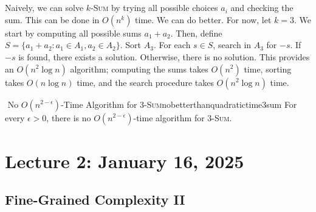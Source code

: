         \vphantom
        \\
        \\
        Naively, we can solve \(k\)-\textsc{Sum} by trying all possible choices \(a_i\) and checking the sum. This can be done in \(O(n^k)\) time. We can do better. For now, let \(k=3\). We start by computing all possible sums \(a_1+a_2\). Then, define \(S=\{a_1+a_2:a_1\in A_1,a_2\in A_2\}\). Sort \(A_3\). For each \(s\in S\), search in \(A_3\) for \(-s\). If \(-s\) is found, there exists a solution. Otherwise, there is no solution. This provides an \(O(n^2\log n)\) algorithm; computing the sums takes \(O(n^2)\) time, sorting takes \(O(n\log n)\) time, and the search procedure takes \(O(n^2\log n)\) time. 
        \begin{hypothesis}{\Stop\,\,No \(O(n^{2-\epsilon})\)-Time Algorithm for \(3\)-\textsc{Sum}}{nobetterthanquadratictime3sum}
            For every \(\epsilon>0\), there is no \(O\left(n^{2-\epsilon}\right)\)-time algorithm for \(3\)-\textsc{Sum}.
        \end{hypothesis}
        

\pagebreak

\section{Lecture 2: January 16, 2025}

    \subsection{Fine-Grained Complexity II}

